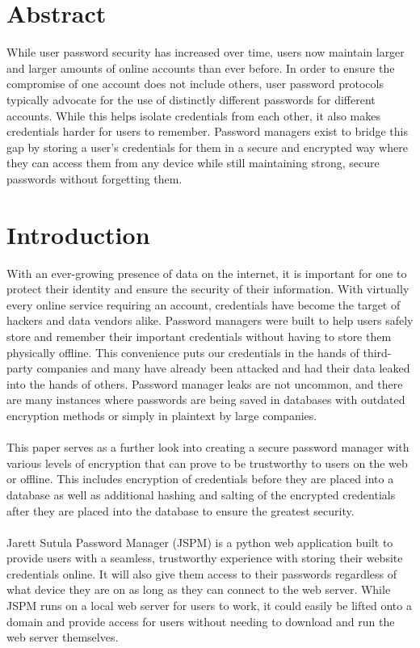 \setcounter{page}{1} %
\section{Abstract}
While user password security has increased over time, users now maintain larger and larger amounts of online accounts than ever before. In order to ensure the compromise of one account does not include others, user password protocols typically advocate for the use of distinctly different passwords for different accounts. While this helps isolate credentials from each other, it also makes credentials harder for users to remember. Password managers exist to bridge this gap by storing a user's credentials for them in a secure and encrypted way where they can access them from any device while still maintaining strong, secure passwords without forgetting them.

\section{Introduction}
With an ever-growing presence of data on the internet, it is important for one to protect their identity and ensure the security of their information. With virtually every online service requiring an account, credentials have become the target of hackers and data vendors alike. Password managers were built to help users safely store and remember their important credentials without having to store them physically offline. This convenience puts our credentials in the hands of third-party companies and many have already been attacked and had their data leaked into the hands of others. Password manager leaks are not uncommon, and there are many instances where passwords are being saved in databases with outdated encryption methods or simply in plaintext by large companies.\\\\
This paper serves as a further look into creating a secure password manager with various levels of encryption that can prove to be trustworthy to users on the web or offline. This includes encryption of credentials before they are placed into a database as well as additional hashing and salting of the encrypted credentials after they are placed into the database to ensure the greatest security. \\\\
Jarett Sutula Password Manager (JSPM) is a python web application built to provide users with a seamless, trustworthy experience with storing their website credentials online. It will also give them access to their passwords regardless of what device they are on as long as they can connect to the web server. While JSPM runs on a local web server for users to work, it could easily be lifted onto a domain and provide access for users without needing to download and run the web server themselves.

